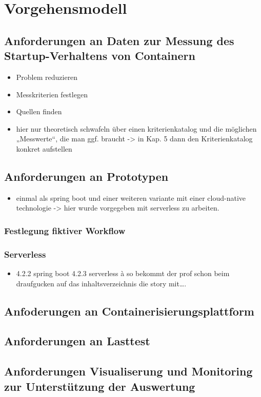 \chapter{Vorgehensmodell}

\section{Anforderungen an Daten zur Messung des Startup-Verhaltens von Containern}
\begin{itemize}
  \item Problem reduzieren
  \item Messkriterien festlegen
  \item Quellen finden
  \item hier nur theoretisch schwafeln über einen kriterienkatalog und die möglichen „Messwerte“, die man ggf. braucht -> in Kap. 5 dann den Kriterienkatalog konkret aufstellen
\end{itemize}




\section{Anforderungen an Prototypen}
\begin{itemize}
  \item einmal als spring boot und einer weiteren variante mit einer cloud-native technologie -> hier wurde vorgegeben mit serverless zu arbeiten.
\end{itemize}

\subsection{Festlegung fiktiver Workflow}

\subsection{Serverless}
\begin{itemize}
  \item  4.2.2 spring boot 4.2.3 serverless à so bekommt der prof schon beim draufgucken auf das inhaltsverzeichnis die story mit….
\end{itemize}

\section{Anfoderungen an Containerisierungsplattform}
\section{Anforderungen an Lasttest}
\section{Anforderungen Visualiserung und Monitoring zur Unterstützung der Auswertung}

